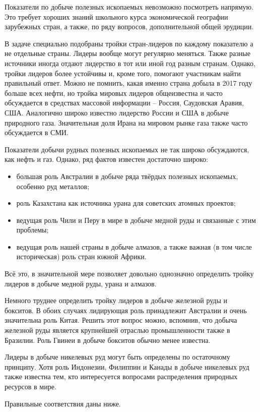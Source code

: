 Показатели по добыче полезных ископаемых невозможно посмотреть напрямую. Это требует хороших знаний школьного курса экономической географии зарубежных стран, а также, по ряду вопросов, дополнительной общей эрудиции.

В задаче специально подобраны тройки стран-лидеров по каждому показателю а не отдельные страны. Лидеры вообще могут регулярно меняться. Также разные источники иногда отдают лидерство в тот или иной год разным странам. Однако, тройки лидеров более устойчивы и, кроме того, помогают участникам найти правильный ответ. Можно не помнить, какая именно страна добыла в 2017 году больше всех нефти, но тройка мировых лидеров общеизвестна и часто обсуждается в средствах массовой информации – Россия, Саудовская Аравия, США. Аналогично широко известно лидерство России и США в добыче природного газа. Значительная доля Ирана на мировом рынке газа также часто обсуждается в СМИ.

Показатели добычи рудных полезных ископаемых не так широко обсуждаются, как нефть и газ. Однако, ряд фактов известен достаточно широко:
\begin{itemize}
    \item большая роль Австралии в добыче ряда твёрдых полезных ископаемых, особенно руд металлов;
    \item роль Казахстана как источника урана для советских атомных проектов;
    \item ведущая роль Чили и Перу в мире в добыче медной руды и связанные с этим проблемы;
    \item ведущая роль нашей страны в добыче алмазов, а также важная (в том числе историческая) роль стран южной Африки.
\end{itemize}

Всё это, в значительной мере позволяет довольно однозначно определить тройку лидеров в добыче медной руды, урана и алмазов.

Немного труднее определить тройку лидеров в добыче железной руды и бокситов. В обоих случаях лидирующая роль принадлежит Австралии и очень значительна роль Китая. Решить этот вопрос можно, вспомнив, что добыча железной руды является крупнейшей отраслью промышленности также в Бразилии. Роль Гвинеи в добыче бокситов обычно менее известна.

Лидеры в добыче никелевых руд могут быть определены по остаточному принципу. Хотя роль Индонезии, Филиппин и Канады в добыче никелевых руд также известна тем, кто интересуется вопросами распределения природных ресурсов в мире.

Правильные соответствия даны ниже.


